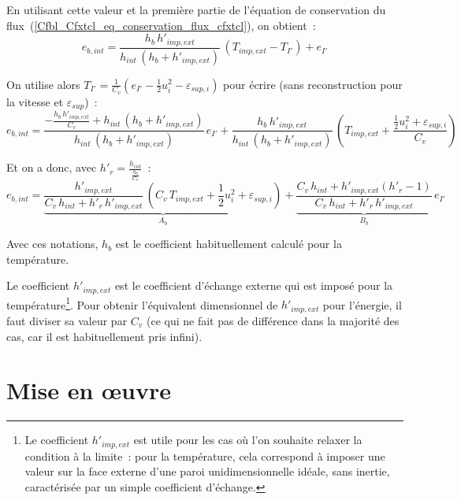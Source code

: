 En utilisant cette valeur et la premi\`ere partie de l'\'equation de conservation
du flux~(\ref{Cfbl_Cfxtcl_eq_conservation_flux_cfxtcl}), on obtient~:
\begin{equation}
e_{b,int} = \frac{h_b\,h'_{imp,ext}}{h_{int}\,(h_b+h'_{imp,ext})}\,(T_{imp,ext}-T_{I'})+e_{I'}
\end{equation}

On utilise alors
$\displaystyle T_{I'}=\frac{1}{C_v}\left(e_{I'}-\frac{1}{2}u^2_{i}-\varepsilon_{sup,i}\right)$ pour
\'ecrire (sans reconstruction pour la vitesse et $\varepsilon_{sup}$)~:
\begin{equation}
\displaystyle e_{b,int} =
\frac{ -\frac{h_b\,h'_{imp,ext}}{C_v}+h_{int}\,(h_b+h'_{imp,ext}) }
     { h_{int}\,(h_b+h'_{imp,ext}) } \,e_{I'}
+\frac{h_b\,h'_{imp,ext}}{h_{int}\,(h_b+h'_{imp,ext})}\,
  \left(T_{imp,ext}+\frac{\frac{1}{2}u^2_{i}+\varepsilon_{sup,i}}{C_v}\right)
\end{equation}


Et on a donc, avec $\displaystyle h'_r=\frac{h_{int}}{\frac{h_b}{C_v}}$~:
\begin{equation}
\displaystyle e_{b,int} =
\underbrace{\frac{ h'_{imp,ext} }{ C_v\,h_{int}+h'_r\,h'_{imp,ext} }\,
  \left(C_v\,T_{imp,ext}+\frac{1}{2}u^2_{i}+\varepsilon_{sup,i}\right)}_{A_b}
+\underbrace{\frac{ C_v\,h_{int}+h'_{imp,ext}(h'_r-1) }{ C_v\,h_{int}+h'_r\,h'_{imp,ext} }}_{B_b}\,e_{I'}
\end{equation}

Avec ces notations, $h_b$ est le coefficient habituellement calcul\'e pour la
temp\'erature.

Le coefficient $h'_{imp,ext}$ est le coefficient d'\'echange externe qui est
impos\'e pour la temp\'erature\footnote{Le coefficient $h'_{imp,ext}$
est utile pour les cas o\`u l'on
souhaite relaxer la condition \`a la limite~:
pour la temp\'erature, cela correspond \`a imposer une valeur sur la face
externe d'une paroi unidimensionnelle id\'eale, sans inertie,
caract\'eris\'ee par un simple coefficient d'\'echange.}.
Pour obtenir l'\'equivalent dimensionnel de $h'_{imp,ext}$ pour l'\'energie,
il faut diviser sa valeur par $C_v$ (ce qui ne fait pas de diff\'erence dans
la majorit\'e des cas, car il est habituellement pris infini).

\section*{Mise en \oe uvre}

